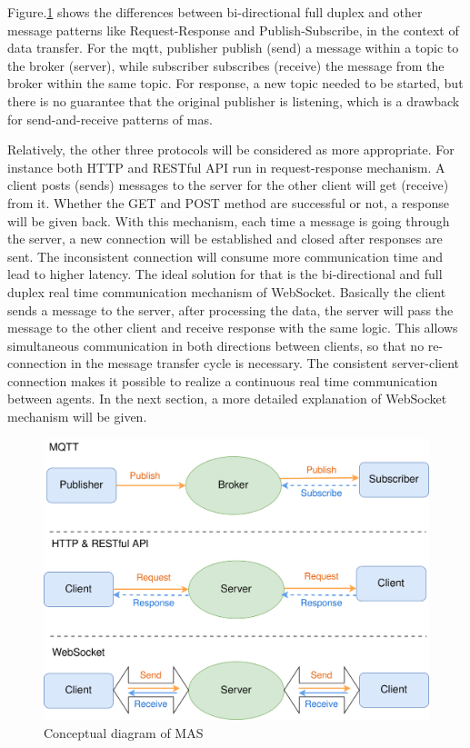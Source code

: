 Figure.\ref{fig: MsgConceptual} shows the differences between bi-directional full duplex and other message patterns like Request-Response and Publish-Subscribe, in the context of data transfer. For the \gls{mqtt}, publisher publish (send) a message within a topic to the broker (server), while subscriber subscribes (receive) the message from the broker within the same topic. For response, a new topic needed to be started, but there is no guarantee that the original publisher is listening, which is a drawback for send-and-receive patterns of \gls{mas}. 

Relatively, the other three protocols will be considered as more appropriate. For instance both HTTP and RESTful API run in request-response mechanism. A client posts (sends) messages to the server for the other client will get (receive) from it. Whether the GET and POST method are successful or not, a response will be given back. With this mechanism, each time a message is going through the server, a new connection will be established and closed after responses are sent. The inconsistent connection will consume more communication time and lead to higher latency. The ideal solution for that is the bi-directional and full duplex real time communication mechanism of WebSocket. Basically the client sends a message to the server, after processing the data, the server will pass the message to the other client and receive response with the same logic. This allows simultaneous communication in both directions between clients, so that no re-connection in the message transfer cycle is necessary. The consistent server-client connection makes it possible to realize a continuous real time communication between agents. In the next section, a more detailed explanation of WebSocket mechanism will be given.

\begin{figure}[htb]
\includegraphics[width=12cm]{figures/MessageConceptual.png}
\centering
\caption{Conceptual diagram of MAS\label{fig: MsgConceptual}}
\end{figure}




